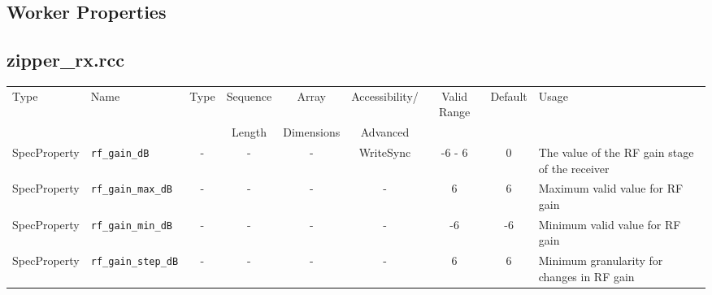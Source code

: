 \documentclass{article}
\def\comp{zipper\_rx}
\begin{document}
\begin{landscape}
	\section*{Worker Properties}
	\subsection*{\comp.rcc}
	\begin{scriptsize}
		\begin{tabular}{|p{2cm}|p{4cm}|c|c|c|c|c|c|p{6.5cm}|}
			\hline
			\rowcolor{blue}
			Type         & Name                                & Type & Sequence & Array      & Accessibility/ & Valid Range  & Default & Usage                                                                                                                                                                                                                       \\
			\rowcolor{blue}
			             &                                     &      & Length   & Dimensions & Advanced       &              &         &                                                                                                                                                                                                                             \\
			\hline
			SpecProperty & \verb+rf_gain_dB+                   & -    & -        & -          & WriteSync      & -6 - 6   & 0       & The value of the RF gain stage of the receiver                                                                                                                                                                              \\
			\hline
			SpecProperty & \verb+rf_gain_max_dB+               & -    & -        & -          & -              & 6           & 6      & Maximum valid value for RF gain                                                                                                                                                                                             \\
			\hline
			SpecProperty & \verb+rf_gain_min_dB+               & -    & -        & -          & -              & -6        & -6   & Minimum valid value for RF gain                                                                                                                                                                                             \\
			\hline
			SpecProperty & \verb+rf_gain_step_dB+              & -    & -        & -          & -              & 6            & 6       & Minimum granularity for changes in RF gain                                                                                                                                                                                  \\

\end{tabular}
\end{scriptsize}
\end{landscape}
\end{document}
